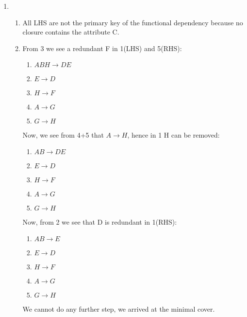 \documentclass[12pt]{extarticle}
\begin{document}
\begin{flushleft}
\begin{enumerate}
\item 
\begin{enumerate}
\item All LHS are not the primary key of the functional dependency because no closure contains the attribute C.
\item From 3 we see a redundant F in 1(LHS) and 5(RHS):
\begin{enumerate}
\item $ABH\rightarrow DE$
\item $E\rightarrow D$
\item $H \rightarrow F$
\item $A\rightarrow G$
\item $G\rightarrow H$
\end{enumerate}
Now, we see from 4+5 that $A\rightarrow H$, hence in 1 H can be removed:
\begin{enumerate}
\item $AB\rightarrow DE$
\item $E\rightarrow D$
\item $H \rightarrow F$
\item $A\rightarrow G$
\item $G\rightarrow H$
\end{enumerate}

Now, from 2 we see that D is redundant in 1(RHS):
\begin{enumerate}
\item $AB\rightarrow E$
\item $E\rightarrow D$
\item $H \rightarrow F$
\item $A\rightarrow G$
\item $G\rightarrow H$
\end{enumerate}
We cannot do any further step, we arrived at the minimal cover.


\end{enumerate}
\end{enumerate}
\end{flushleft}
\end{document}

